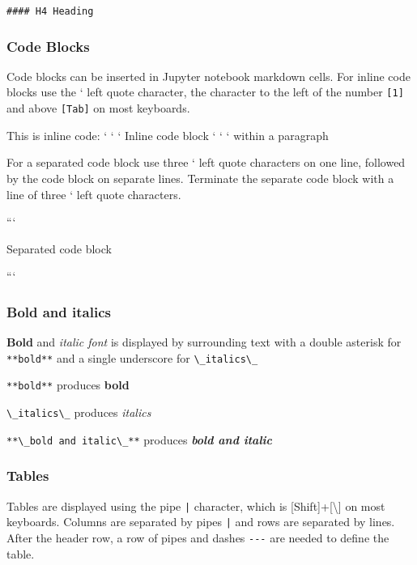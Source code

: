 \documentclass{book}
\newcommand{\passthrough}[1]{#1}
\begin{document}
\begin{lstlisting}
#### H4 Heading
\end{lstlisting}

\hypertarget{code-blocks}{%
\subsubsection{Code Blocks}\label{code-blocks}}

Code blocks can be inserted in Jupyter notebook markdown cells. For
inline code blocks use the ` left quote character, the character to the
left of the number \passthrough{\lstinline![1]!} and above
\passthrough{\lstinline![Tab]!} on most keyboards.

This is inline code: ` ` ` Inline code block ` ` ` within a paragraph

For a separated code block use three ` left quote characters on one
line, followed by the code block on separate lines. Terminate the
separate code block with a line of three ` left quote characters.

```

Separated code block

```

\hypertarget{bold-and-italics}{%
\subsubsection{Bold and italics}\label{bold-and-italics}}

\textbf{Bold} and \emph{italic font} is displayed by surrounding text
with a double asterisk for \passthrough{\lstinline!**bold**!} and a
single underscore for \passthrough{\lstinline!\_italics\_!}

\passthrough{\lstinline!**bold**!} produces \textbf{bold}

\passthrough{\lstinline!\_italics\_!} produces \emph{italics}

\passthrough{\lstinline!**\_bold and italic\_**!} produces
\textbf{\emph{bold and italic}}

\hypertarget{tables}{%
\subsubsection{Tables}\label{tables}}

Tables are displayed using the pipe \passthrough{\lstinline!|!}
character, which is {[}Shift{]}+{[}\textbackslash{}{]} on most
keyboards. Columns are separated by pipes \passthrough{\lstinline!|!}
and rows are separated by lines. After the header row, a row of pipes
and dashes \passthrough{\lstinline!---!} are needed to define the table.
\end{document}

